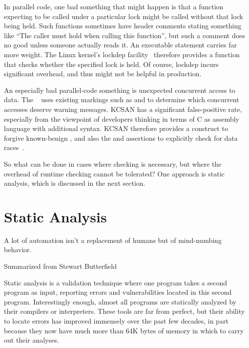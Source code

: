 In parallel code, one bad something that might happen is that
a function expecting to be called under a particular lock might be called
without that lock being held.
Such functions sometimes have header comments stating something like
``The caller must hold  when calling this function'', but
such a comment does no good unless someone actually reads it.
An executable statement carries far more weight.
The Linux kernel's lockdep
facility~\cite{JonathanCorbet2006lockdep,StevenRostedt2011locdepCryptic}
therefore provides a  function that checks
whether the specified lock is held.
Of course, lockdep incurs significant overhead, and thus might not be
helpful in production.

An especially bad parallel-code something is unexpected concurrent
access to data.
The ~\cite{JonathanCorbet2019KCSAN}
uses existing markings such as  and 
to determine which concurrent accesses deserve warning messages.
KCSAN has a significant false-positive rate, especially from the
viewpoint of developers thinking in terms of C as assembly language
with additional syntax.
KCSAN therefore provides a  construct to forgive
known-benign , and also the 
and  assertions to explicitly check for data
races~\cite{MarcoElver2020FearDataRaceDetector1,MarcoElver2020FearDataRaceDetector2}.

So what can be done in cases where checking is necessary, but where the
overhead of runtime checking cannot be tolerated?
One approach is static analysis, which is discussed in the next section.

\section{Static Analysis}
\label{sec:debugging:Static Analysis}
%
\epigraph{A lot of automation isn't a replacement of
	  humans but of mind-numbing behavior.}
	 {Summarized from Stewart Butterfield}

Static analysis is a validation technique where one program takes a second
program as input, reporting errors and vulnerabilities located in this
second program.
Interestingly enough, almost all programs are statically analyzed
by their compilers or interpreters.
These tools are far from perfect, but their ability to locate
errors has improved immensely over the past few decades, in part because
they now have much more than 64K bytes of memory in which to carry out their
analyses.

